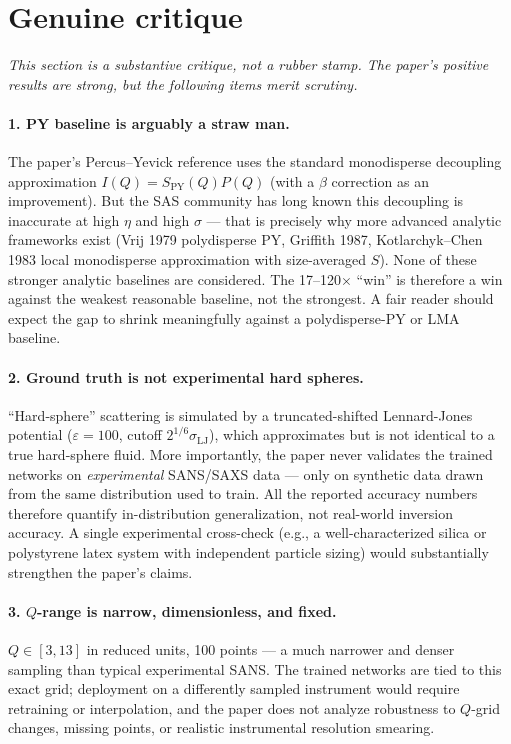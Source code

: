 \documentclass[11pt]{article}
\begin{document}
\section{Genuine critique}
\emph{This section is a substantive critique, not a rubber stamp. The
paper's positive results are strong, but the following items merit
scrutiny.}

\paragraph{1. PY baseline is arguably a straw man.}
The paper's Percus--Yevick reference uses the standard monodisperse
decoupling approximation $I(Q)=S_\mathrm{PY}(Q)P(Q)$ (with a $\beta$
correction as an improvement). But the SAS community has long known this
decoupling is inaccurate at high $\eta$ and high $\sigma$ --- that is
precisely why more advanced analytic frameworks exist (Vrij 1979
polydisperse PY, Griffith 1987, Kotlarchyk--Chen 1983 local monodisperse
approximation with size-averaged $S$). None of these stronger analytic
baselines are considered. The 17--120$\times$ ``win'' is therefore a win
against the weakest reasonable baseline, not the strongest. A fair reader
should expect the gap to shrink meaningfully against a polydisperse-PY or
LMA baseline.

\paragraph{2. Ground truth is not experimental hard spheres.}
``Hard-sphere'' scattering is simulated by a truncated-shifted
Lennard-Jones potential ($\varepsilon=100$, cutoff $2^{1/6}\sigma_\mathrm{LJ}$),
which approximates but is not identical to a true hard-sphere fluid.
More importantly, the paper never validates the trained networks on
\emph{experimental} SANS/SAXS data --- only on synthetic data drawn from
the same distribution used to train. All the reported accuracy numbers
therefore quantify in-distribution generalization, not real-world
inversion accuracy. A single experimental cross-check (e.g., a
well-characterized silica or polystyrene latex system with independent
particle sizing) would substantially strengthen the paper's claims.

\paragraph{3. $Q$-range is narrow, dimensionless, and fixed.}
$Q\!\in\![3,13]$ in reduced units, 100 points --- a much narrower and
denser sampling than typical experimental SANS. The trained networks are
tied to this exact grid; deployment on a differently sampled instrument
would require retraining or interpolation, and the paper does not analyze
robustness to $Q$-grid changes, missing points, or realistic instrumental
resolution smearing.
\end{document}
